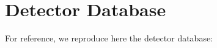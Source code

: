 \section{Detector Database}

For reference, we reproduce here the detector database:
{\tiny
\begin{alltt}

\end{alltt}}
